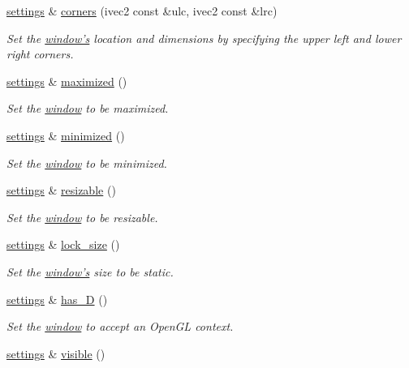 \begin{DoxyCompactItemize}
\hyperlink{classgfx_1_1window_1_1settings}{settings} \& \hyperlink{classgfx_1_1window_1_1settings_ac06776999933d870059038c06c841d14}{corners} (ivec2 const \&ulc, ivec2 const \&lrc)
\begin{DoxyCompactList}\small\item\em Set the \hyperlink{classgfx_1_1window}{window's} location and dimensions by specifying the upper left and lower right corners. \end{DoxyCompactList}\item 
\hyperlink{classgfx_1_1window_1_1settings}{settings} \& \hyperlink{classgfx_1_1window_1_1settings_a6e186619b5e4818968bb0d2793662104}{maximized} ()
\begin{DoxyCompactList}\small\item\em Set the \hyperlink{classgfx_1_1window}{window} to be maximized. \end{DoxyCompactList}\item 
\hyperlink{classgfx_1_1window_1_1settings}{settings} \& \hyperlink{classgfx_1_1window_1_1settings_a51a060d011d68e5ec27eff28b3076695}{minimized} ()
\begin{DoxyCompactList}\small\item\em Set the \hyperlink{classgfx_1_1window}{window} to be minimized. \end{DoxyCompactList}\item 
\hyperlink{classgfx_1_1window_1_1settings}{settings} \& \hyperlink{classgfx_1_1window_1_1settings_ab854595e068cd4bc3d95e81ff3b1db80}{resizable} ()
\begin{DoxyCompactList}\small\item\em Set the \hyperlink{classgfx_1_1window}{window} to be resizable. \end{DoxyCompactList}\item 
\hyperlink{classgfx_1_1window_1_1settings}{settings} \& \hyperlink{classgfx_1_1window_1_1settings_a84a5a94c425ca41c8523927b11f413d7}{lock\-\_\-size} ()
\begin{DoxyCompactList}\small\item\em Set the \hyperlink{classgfx_1_1window}{window's} size to be static. \end{DoxyCompactList}\item 
\hyperlink{classgfx_1_1window_1_1settings}{settings} \& \hyperlink{classgfx_1_1window_1_1settings_a76b165625dbc21823aa98e09435e900e}{has\-\_\-D} ()
\begin{DoxyCompactList}\small\item\em Set the \hyperlink{classgfx_1_1window}{window} to accept an Open\-G\-L context. \end{DoxyCompactList}\item 
\hypertarget{classgfx_1_1window_1_1settings_aa799c07c95c4185cee63f8fb87c15b3c}{\hyperlink{classgfx_1_1window_1_1settings}{settings} \& \hyperlink{classgfx_1_1window_1_1settings_aa799c07c95c4185cee63f8fb87c15b3c}{visible} ()}\label{classgfx_1_1window_1_1settings_aa799c07c95c4185cee63f8fb87c15b3c}


\end{DoxyCompactItemize}

